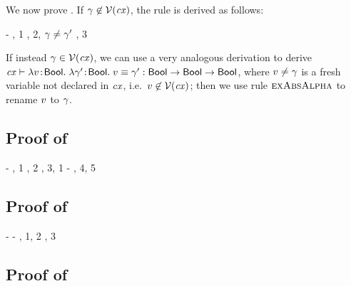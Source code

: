 We now prove \Reiff. If $\gamma\not\in\mathcal{V}(\mathit{cx})$, the rule is derived as
follows:
\begin{derivation}
\step{\cxwfO}
     {\hyp}
\step{\cxwf{\snoc{\cx}{\vdec{\varfx}{\bool}}}}
     {\Rcxvdecbool, 1}
     {\RtmpI, 2, $\gamma\neq\gamma'$}
     {\Reabs, 3}
\end{derivation}
If instead $\gamma\in\mathcal{V}(\mathit{cx})$, we can use a very analogous derivation to
derive
$\mathit{cx}\vdash\lambda v\!:\!\mathsf{Bool}.\;\lambda\gamma'\!:\!\mathsf{Bool}.\;v\equiv\gamma':\mathsf{Bool}\to\mathsf{Bool}\to\mathsf{Bool}$,
where $v\neq\gamma$ is a fresh variable not declared in $\mathit{cx}$, i.e.\
$v\not\in\mathcal{V}(\mathit{cx})$; then we use rule $\textsc{exAbsAlpha}$ to rename $v$ to
$\gamma$.



\subsection*{Proof of }

\begin{derivation}
     {\hyp}
\step{\cxwfO}
     {, 1}
\step{\hastyO{\iiffop}{\tarr{\bool}{\tarr{\bool}{\bool}}}}
     {\Reiff, 2}
     {\Reapp, 3, 1}
     {\hyp}
     {\Reapp, 4, 5}
\end{derivation}



\subsection*{Proof of \thmref{thm-eneq}}

\begin{derivation}
     {\hyp}
     {\hyp}
\step{\hastyO{\eqO}{\bool}}
     {\Reeq, 1, 2}
\step{\hastyO{\nega{(\eqO)}}{\bool}}
     {\Renega, 3}
\end{derivation}



\subsection*{Proof of }

